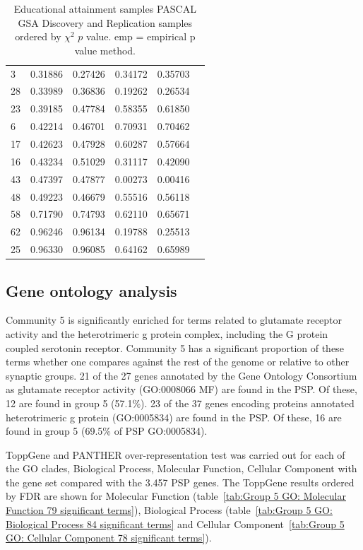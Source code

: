 \begin{table}[ht]
\begin{tabular}{llllll}
  3 & 0.31886 & 0.27426 & 0.34172 & 0.35703 \\ 
  28 & 0.33989 & 0.36836 & 0.19262 & 0.26534 \\ 
  23 & 0.39185 & 0.47784 & 0.58355 & 0.61850 \\ 
  6 & 0.42214 & 0.46701 & 0.70931 & 0.70462 \\ 
  17 & 0.42623 & 0.47928 & 0.60287 & 0.57664 \\ 
  16 & 0.43234 & 0.51029 & 0.31117 & 0.42090 \\ 
  43 & 0.47397 & 0.47877 & 0.00273 & 0.00416 \\ 
  48 & 0.49223 & 0.46679 & 0.55516 & 0.56118 \\ 
  58 & 0.71790 & 0.74793 & 0.62110 & 0.65671 \\ 
  62 & 0.96246 & 0.96134 & 0.19788 & 0.25513 \\ 
  25 & 0.96330 & 0.96085 & 0.64162 & 0.65989 \\ 
   \bottomrule
\end{tabular}
\caption[GSA PASCAL Educational attainment sample]{Educational attainment samples PASCAL GSA Discovery and Replication samples ordered by $\chi^2$ $p$ value. emp = empirical p value method.} 
\label{tab:Pascal Education ordered by chi2P}
\end{table}
\clearpage



\subsection{Gene ontology analysis}
\label{sec: spectral group 5 analysis}
Community 5 is significantly enriched for terms related to glutamate receptor activity and the heterotrimeric g protein complex, including the G protein coupled serotonin receptor. Community 5 has a significant proportion of these terms whether one compares against the rest of the genome or relative to other synaptic groups. 21 of the 27 genes annotated by the Gene Ontology Consortium as
glutamate receptor activity (GO:0008066 MF) are found in the PSP. Of these, 12 are found in group 5 (57.1\%). 
23 of the 37 genes encoding proteins annotated heterotrimeric g protein (GO:0005834) are found in the PSP. Of these, 16 are found in group 5 (69.5\% of PSP GO:0005834). 

ToppGene and PANTHER over-representation test was carried out for each of the GO clades, Biological Process, Molecular Function, Cellular Component with the gene set compared with the 3.457 PSP genes. The ToppGene results ordered by FDR are shown for Molecular Function (table~\ref{tab:Group 5 GO: Molecular Function 79 significant terms}), Biological Process (table~\ref{tab:Group 5 GO: Biological Process 84 significant terms} and Cellular Component~\ref{tab:Group 5 GO: Cellular Component 78 significant terms}).

